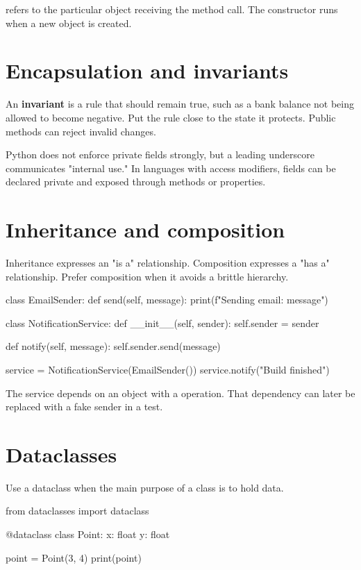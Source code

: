 \documentclass[11pt,openany,oneside]{book}
\newcommand{\inlinecode}[1]{\texttt{\small\detokenize{#1}}}
\newcommand{\term}[1]{\textbf{#1}\index{#1}}
\begin{document}
\inlinecode{self} refers to the particular object receiving the method call. The constructor \inlinecode{__init__} runs when a new object is created.

\section{Encapsulation and invariants}

An \term{invariant} is a rule that should remain true, such as a bank balance not being allowed to become negative. Put the rule close to the state it protects. Public methods can reject invalid changes.

Python does not enforce private fields strongly, but a leading underscore communicates "internal use." In languages with access modifiers, fields can be declared private and exposed through methods or properties.

\section{Inheritance and composition}

Inheritance expresses an "is a" relationship. Composition expresses a "has a" relationship. Prefer composition when it avoids a brittle hierarchy.

\begin{code}[language=Python]
class EmailSender:
    def send(self, message):
        print(f"Sending email: {message}")

class NotificationService:
    def __init__(self, sender):
        self.sender = sender

    def notify(self, message):
        self.sender.send(message)

service = NotificationService(EmailSender())
service.notify("Build finished")
\end{code}

The service depends on an object with a \inlinecode{send} operation. That dependency can later be replaced with a fake sender in a test.

\section{Dataclasses}

Use a dataclass when the main purpose of a class is to hold data.

\begin{code}[language=Python]
from dataclasses import dataclass

@dataclass
class Point:
    x: float
    y: float

point = Point(3, 4)
print(point)
\end{code}
\end{document}
